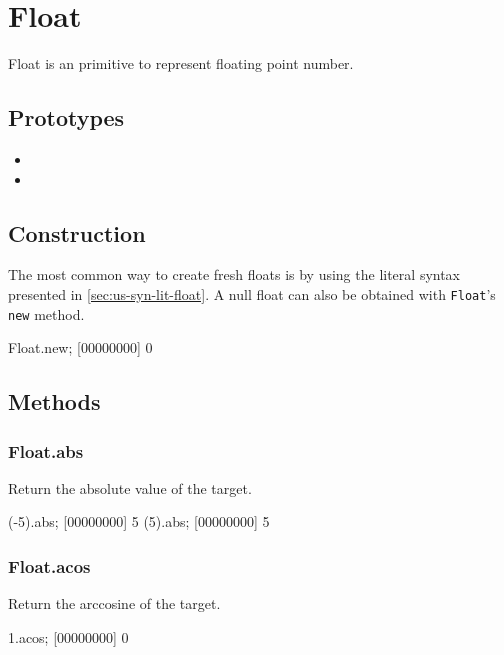 \section{Float}

Float is an \us primitive to represent floating point number.

\subsection{Prototypes}

\begin{itemize}
\item {}
\item {}
\end{itemize}

\subsection{Construction}

The most common way to create fresh floats is by using the literal
syntax presented in \autoref{sec:us-syn-lit-float}. A null float can also be
obtained with \lstinline|Float|'s \lstinline|new| method.

\begin{urbiscript}
Float.new;
[00000000] 0
\end{urbiscript}

\subsection{Methods}

\subsubsection{Float.abs}

Return the absolute value of the target.

\begin{urbiscript}
(-5).abs;
[00000000] 5
(5).abs;
[00000000] 5
\end{urbiscript}

\subsubsection{Float.acos}

Return the arccosine of the target.

\begin{urbiscript}
1.acos;
[00000000] 0
\end{urbiscript}

